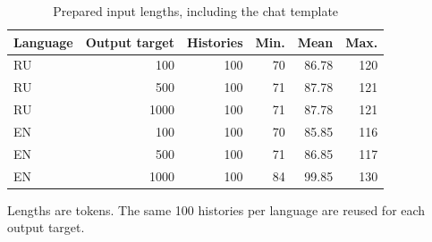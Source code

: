 \begin{table}[htbp]
\centering
\caption{Prepared input lengths, including the chat template}
\label{tab:prompts}
\begin{singlespace}
\small
\setlength{\tabcolsep}{4pt}
\renewcommand{\arraystretch}{1.2}
\begin{tabular}{@{}lrrrrr@{}}
\toprule
Language & Output target & Histories & Min. & Mean & Max. \\
\midrule
RU & 100 & 100 & 70 & 86.78 & 120 \\
RU & 500 & 100 & 71 & 87.78 & 121 \\
RU & 1000 & 100 & 71 & 87.78 & 121 \\
EN & 100 & 100 & 70 & 85.85 & 116 \\
EN & 500 & 100 & 71 & 86.85 & 117 \\
EN & 1000 & 100 & 84 & 99.85 & 130 \\
\bottomrule
\end{tabular}
\par\smallskip\raggedright Lengths are tokens. The same 100 histories per language are reused for each output target.
\end{singlespace}
\end{table}

